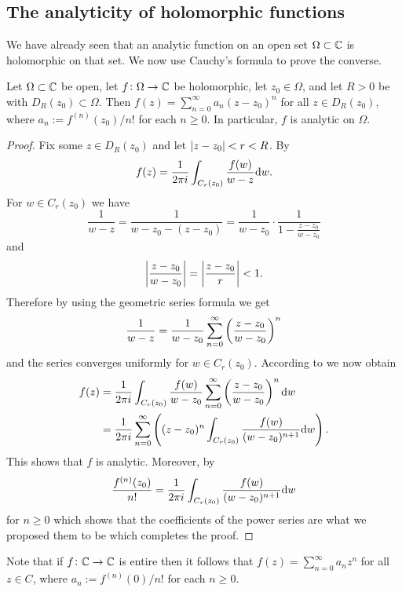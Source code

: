 \documentclass[11pt,a4paper]{article}
\begin{document}
\subsection{The analyticity of holomorphic functions}

\begin{remark}
We have already seen that an analytic function on an open set
$\Omega \subset \mathbb{C}$ is holomorphic on that set.
We now use Cauchy's formula to prove the converse.
\end{remark}

\begin{theorem}
  \label{thm:holomorphic-implies-analytic}
  Let $\Omega \subset \mathbb{C}$ be open,
  let $f \colon \Omega \to \mathbb{C}$ be holomorphic,
  let $z_0 \in \Omega$,
  and let $R > 0$ be with $D_R(z_0) \subset \Omega$.
  Then $f(z) = \sum_{n=0}^{\infty} a_n (z - z_0)^n$
  for all $z \in D_R(z_0)$,
  where $a_n := f^{(n)}(z_0) / n!$ for each $n \geq 0$.
  In particular, $f$ is analytic on $\Omega$.
\end{theorem}
\begin{proof}
  Fix some $z \in D_R(z_0)$ and let $\left\lvert z - z_0\right\rvert < r < R$.
  By 
  \[
    f(z) = \frac{1}{2 \pi i} \int_{C_r(z_0)} \frac{f(w)}{w - z} \mathrm{d} w.
  \]
  For $w \in C_r(z_0)$ we have
  \[
    \frac{1}{w - z} =
    \frac{1}{w - z_0 - (z - z_0)} =
    \frac{1}{w - z_0} \cdot \frac{1}{1 - \frac{z - z_0}{w - z_0}}
  \]
  and
  \[
    \left\lvert\frac{z - z_0}{w - z_0}\right\rvert =
    \left\lvert\frac{z - z_0}{r}\right\rvert < 1.
  \]
  Therefore by using the geometric series formula we get
  \[
    \frac{1}{w - z} =
    \frac{1}{w - z_0} \sum_{n=0}^{\infty} \del{\frac{z - z_0}{w - z_0}}^{n}
  \]
  and the series converges uniformly for $w \in C_r(z_0)$.
  According to  we now obtain
  \begin{align*}
    f(z) &= \frac{1}{2 \pi i} \int_{C_r(z_0)}
    \frac{f(w)}{w - z_0} \sum_{n=0}^{\infty} \del{\frac{z - z_0}{w - z_0}}^{n} \dw
         \\ &=
         \frac{1}{2 \pi i} \sum_{n=0}^{\infty} \del{(z - z_0)^n
         \int_{C_r(z_0)} \frac{f(w)}{(w - z_0)^{n+1}} \dw}.
  \end{align*}
  This shows that $f$ is analytic.
  Moreover, by 
  \[
    \frac{f^{(n)}(z_0)}{n!} =
    \frac{1}{2 \pi i}
    \int_{C_r(z_0)} \frac{f(w)}{(w - z_0)^{n+1}} \mathrm{d} w
  \]
  for $n \geq 0$ which shows that the coefficients of the power series are
  what we proposed them to be which completes the proof.
\end{proof}
\begin{remark}
  Note that if $f \colon \mathbb{C} \to \mathbb{C}$ is entire then it follows that
  $f(z) = \sum_{n=0}^{\infty} a_n z^n$ for all $z \in C$,
  where $a_n := f^{(n)}(0) / n!$ for each $n \geq 0$.
\end{remark}
\end{document}
